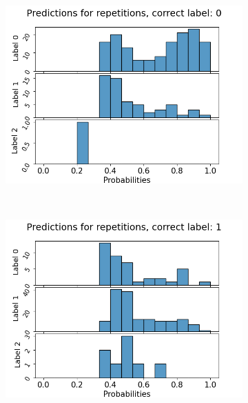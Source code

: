 \begin{figure}
  \begin{subfigure}[t]{0.3\textwidth}
    \includegraphics[width=\textwidth]{files/figs/app/hists/femval/pr0.png}
  \end{subfigure}
  ~
  \begin{subfigure}[t]{0.3\textwidth}
    \includegraphics[width=\textwidth]{files/figs/app/hists/femval/pr1.png}
  \end{subfigure}
  ~
  \begin{subfigure}[t]{0.3\textwidth}

\end{subfigure}
\end{figure}

